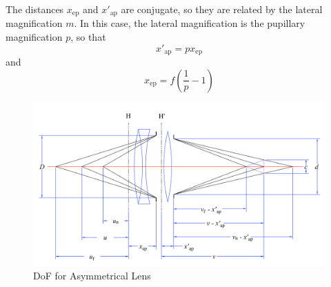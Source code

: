 \documentclass[11pt, oneside]{scrartcl}   	%
\begin{document}
The distances $x_\mathrm{ep}$ and $x'_\mathrm{ap}$ are conjugate, so they are related by the lateral magnification $m$. In
this case, the lateral magnification is the pupillary magnification
$p$, so that
\begin{equation}
  \label{eq:xapp}
  x'_\mathrm{ap} = p x_\mathrm{ep}
\end{equation}
and
\begin{equation}
  \label{eq:xep}
  x_\mathrm{ep} = f\left(\frac1p-1\right)
\end{equation}

\begin{figure}[htbp] %
   \centering
   \includegraphics[width=\linewidth]{figure/fig_dofd_4} 
   \caption{DoF for Asymmetrical Lens}
   \label{fig:DOFasymlens}
\end{figure}
\end{document}
